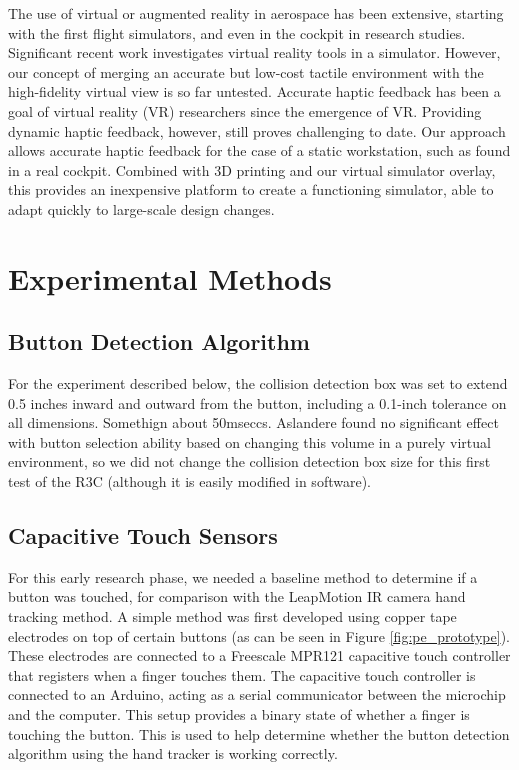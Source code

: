 The use of virtual or augmented reality in aerospace has been extensive, starting with the first flight simulators, and even in the cockpit in research studies\cite{foyle_taxiway_1996, bachelder_fused_2013}.
Significant recent work investigates virtual reality tools in a simulator\cite{h._wan_mrstudio:_2011, i._yavrucuk_low_2011, t._aslandere_virtual_2015}.
However, our concept of merging an accurate but low-cost tactile environment with the high-fidelity virtual view is so far untested.
Accurate haptic feedback has been a goal of virtual reality (VR) researchers since the emergence of VR.
Providing dynamic haptic feedback, however, still proves challenging to date\cite{stone_haptic_2001,lecuyer_simulating_2009}.
Our approach allows accurate haptic feedback for the case of a static workstation, such as found in a real cockpit.
Combined with 3D printing and our virtual simulator overlay, this provides an inexpensive platform to create a functioning simulator, able to adapt quickly to large-scale design changes.

\section{Experimental Methods}

\subsection{Button Detection Algorithm}

For the experiment described below, the collision detection box was set to extend 0.5 inches inward and outward from the button, including a 0.1-inch tolerance on all dimensions.
Somethign about 50mseccs.
Aslandere \cite{t._aslandere_virtual_2015} found no significant effect with button selection ability based on changing this volume in a purely virtual environment, so we did not change the collision detection box size for this first test of the R3C (although it is easily modified in software).

\subsection{Capacitive Touch Sensors}

For this early research phase, we needed a baseline method to determine if a button was touched, for comparison with the LeapMotion IR camera hand tracking method.
A simple method was first developed using copper tape electrodes on top of certain buttons (as can be seen in Figure \ref{fig:pe_prototype}).
These electrodes are connected to a Freescale MPR121 capacitive touch controller that registers when a finger touches them.
The capacitive touch controller is connected to an Arduino, acting as a serial communicator between the microchip and the computer.
This setup provides a binary state of whether a finger is touching the button.
This is used to help determine whether the button detection algorithm using the hand tracker is working correctly.

